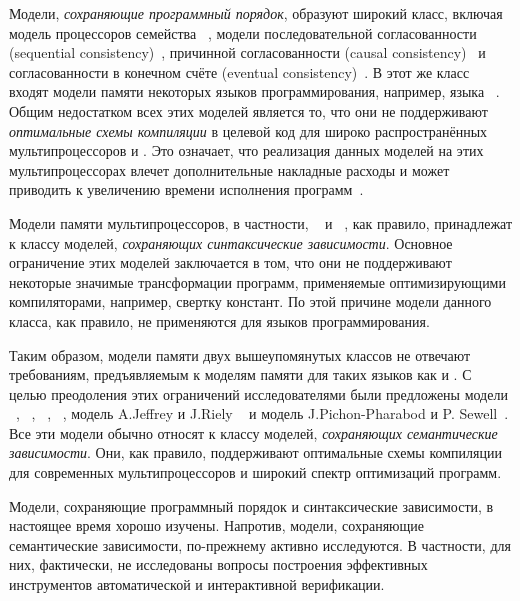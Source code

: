 Модели, \emph{сохраняющие программный порядок}, образуют широкий класс,
включая модель \TSO процессоров семейства \Intel~\autocite{Sewell-al:CACM10},
модели последовательной согласованности (sequential consistency)~\autocite{Lamport:TC79},
причинной согласованности (causal consistency)~\autocite{Lahav-Boker:PLDI2020}
и согласованности в конечном счёте (eventual consistency)~\autocite{Jagadeesan-al:ESOP2018}. 
В этот же класс входят  модели памяти некоторых языков программирования, например,
языка \OCaml~\autocite{Dolan-al:PLDI18}.
Общим недостатком всех этих моделей является то,
что они не поддерживают \emph{оптимальные схемы компиляции} 
в целевой код для широко распространённых мультипроцессоров \ARM и \POWER.
Это означает, что реализация данных моделей на этих мультипроцессорах
влечет дополнительные накладные расходы и может приводить
к увеличению времени исполнения программ~\autocite{Ou-Demsky:OOPSLA18}. 

Модели памяти мультипроцессоров,
в частности, \ARM~\autocite{Pulte-al:POPL18} и \POWER~\autocite{Sarkar-al:PLDI11}, 
как правило, принадлежат к классу моделей, \emph{сохраняющих синтаксические зависимости}. 
Основное ограничение этих моделей заключается в том, 
что они не поддерживают некоторые значимые трансформации программ, 
применяемые оптимизирующими компиляторами, например, свертку констант.
По этой причине модели данного класса, как правило,
не применяются для языков программирования.  

Таким образом, модели памяти двух вышеупомянутых классов 
не отвечают требованиям, предъявляемым к моделям памяти для таких языков как \CPP и \Java. 
С целью преодоления этих ограничений исследователями были предложены модели  
\Prm~\autocite{Kang-al:POPL17}, \Wkm~\autocite{Chakraborty-Vafeiadis:POPL19}, 
\MRD~\autocite{Paviotti-al:ESOP20}, \PwP~\autocite{Jagadeesan-al:OOPSLA2020},
модель A.Jeffrey и J.Riely ~\autocite{Jeffrey-Riely:LICS16} и
модель J.Pichon-Pharabod и P. Sewell~\autocite{PichonPharabod-Sewell:POPL16}.
Все эти модели обычно относят к классу моделей, \emph{сохраняющих семантические зависимости}.
Они, как правило, поддерживают оптимальные схемы компиляции
для современных мультипроцессоров и широкий спектр оптимизаций программ.

Модели, сохраняющие программный порядок и синтаксические зависимости, 
в настоящее время хорошо изучены. Напротив, модели, 
сохраняющие семантические зависимости, по-прежнему активно исследуются.
В частности, для них, фактически, не исследованы
вопросы построения эффективных инструментов автоматической и интерактивной верификации. 

